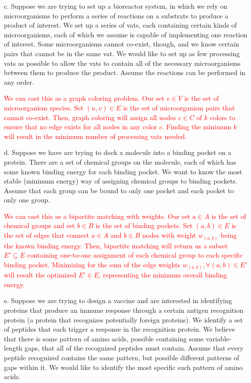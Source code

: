 \documentclass[11pt]{article}
\begin{document}
c.  Suppose we are trying to set up a bioreactor system, in which we rely on microorganisms to perform a series of reactions on a substrate to produce a product of interest.  We set up a series of vats, each containing certain kinds of microorganisms, each of which we assume is capable of implementing one reaction of interest.  Some microorganisms cannot co-exist, though, and we know certain pairs that cannot be in the same vat.  We would like to set up as few processing vats as possible to allow the vats to contain all of the necessary microorganisms between them to produce the product. Assume the reactions can be performed in any order.  

\textcolor{red}{We can cast this as a graph coloring problem. Our set $v \in V$ is the set of microorganism species. Set $(u, v) \in E$ is the set of microorganism pairs that cannot co-exist. Then, graph coloring will assign all nodes $c \in C$ of $k$ colors to ensure that no edge exists for all nodes in any color $c$. Finding the minimum $k$ will result in the minimum number of processing vats needed.}

d. Suppose we have are trying to dock a molecule into a binding pocket on a protein.  There are a set of chemical groups on the molecule, each of which has some known binding energy for each binding pocket.  We want to know the most stable (minimum energy) way of assigning chemical groups to binding pockets.  Assume that each group can be bound to only one pocket and each pocket to only one group.

\textcolor{red}{We can cast this as a bipartite matching with weights. Our set $a \in A$ is the set of chemical groups and set $b \in B$ is the set of binding pockets. Set $(a, b) \in E$ is the set of edges that connect $a \in A$ and $b \in B$ nodes with weight $w_{(a, b)}$ being the known binding energy. Then, bipartite matching will return us a subset $E' \subseteq E$ containing one-to-one assignment of each chemical group to each specific binding pocket. Minimizing for the sum of the edge weights $w_{(a, b)}, \forall (a, b) \in E'$ will result the optimized $E' \in E$, representing the minimum overall binding energy.}

e. Suppose we are trying to design a vaccine and are interested in identifying proteins that produce an immune response through a certain antigen recognition protein (a protein that recognizes potentially foreign proteins).  We identify a set of peptides that each trigger a response in the recognition protein.  We believe that there is some pattern of amino acids, possible containing some variable-length gaps, that all of the
recognized peptides must contain.  Assume that every peptide recognized contains the same pattern, but possible different patterns of gaps within it.  We would like to identify the most specific such pattern of amino acids.
\end{document}
